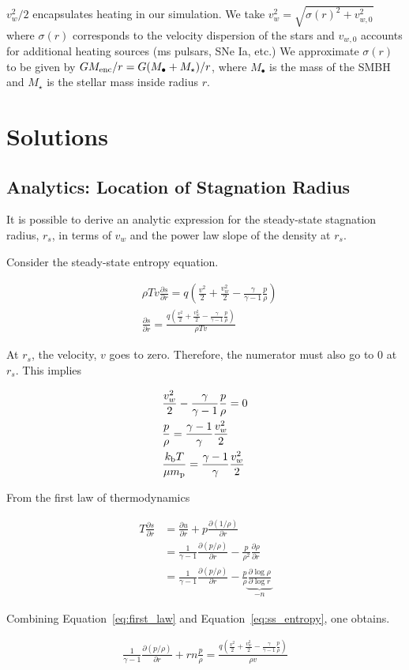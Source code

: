 \documentclass[usenatbib,fleqn]{mn2e}
\newcommand{\rs}{r_s}
\newcommand{\dxdy}[2]{\frac{\partial #1}{\partial #2} }
\newcommand{\ddr}[1]{\dxdy{#1}{r}}
\newcommand{\dsdr}{\dxdy{s}{r}}
\newcommand{\ke}{\frac{v^2}{2}}
\newcommand{\kew}{\frac{v_w^2}{2}}
\newcommand{\gammaf}{\frac{\gamma}{\gamma-1}}
\newcommand{\gammafi}{\frac{\gamma-1}{\gamma}}
\newcommand{\cs}{\frac{p}{\rho}}
\newcommand{\Q}{q (\ke+\kew-\gammaf \cs)}
\newcommand{\kb}{k_{\rm b}}
\renewcommand{\mp}{m_{\rm p}}
\newcommand{\Menc}{M_{\rm enc}}
\newcommand{\Mstar}{M_{\star}}
\newcommand{\Mbh}[1][]{M_{\bullet#1}}
\begin{document}
$v_w^2/2$ encapsulates heating in our simulation. We take $v_w^2=\sqrt{\sigma(r)^2+v_{w,0}^2}$ where $\sigma(r)$ corresponds to the velocity dispersion of the stars and $v_{w,0}$ accounts for additional heating sources (ms pulsars, SNe Ia, etc.)  We approximate $\sigma(r)$ to be given by $G \Menc/r=G(\Mbh+\Mstar)/r$, where $\Mbh$ is the mass of the SMBH and $\Mstar$ is the stellar mass inside radius $r$. 

\section{Solutions}
\subsection{Analytics: Location of Stagnation Radius}
It is possible to derive an analytic expression for the steady-state stagnation radius, $\rs$, in terms of $v_w$ and the power law slope of the density at $\rs$.

Consider the steady-state entropy equation.

\begin{align}
&\rho T v \dsdr=\Q\\
&\dsdr=\frac{\Q}{\rho T v} \label{eq:ss_entropy}
\end{align}

At $\rs$, the velocity, $v$ goes to zero.  Therefore, the numerator must also go to 0 at $\rs$. This implies 

\begin{align}
 &\kew-\gammaf \cs=0\\
 &\cs=\gammafi \kew\\
 &\frac{\kb T}{\mu \mp}=\gammafi \kew \label{eq:tstag}
\end{align}

From the first law of thermodynamics 

\begin{align}
T\dsdr&=\ddr{u}+p\ddr{(1/\rho)}\\
&=\frac{1}{\gamma-1}\ddr{(p/\rho)}-\frac{p}{\rho^2}\ddr{\rho}\\
&=\frac{1}{\gamma-1}\ddr{(p/\rho)}-\frac{p}{\rho} \underbrace{\dxdy{\log{\rho}}{\log{r}}}_{-n} \label{eq:first_law}
\end{align}

Combining Equation~\ref{eq:first_law} and Equation~\ref{eq:ss_entropy}, one obtains.

\begin{align}
\frac{1}{\gamma-1}\ddr{(p/\rho)}+r n \cs=\frac{\Q}{\rho  v} \label{eqn:combo1}
\end{align}
\end{document}
